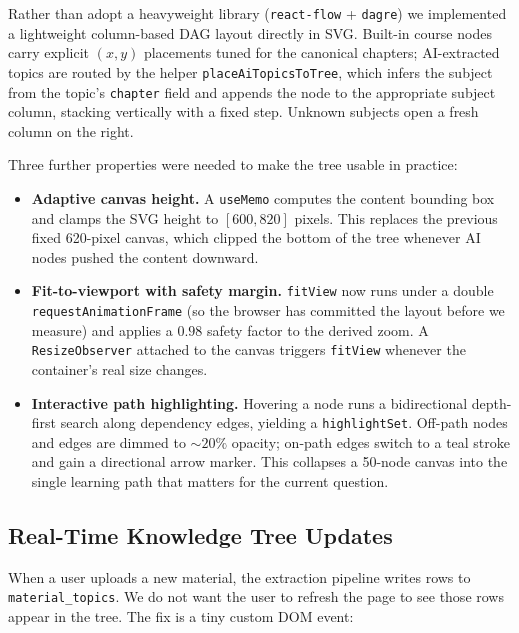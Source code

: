 \documentclass[11pt,a4paper]{article}
\newcommand{\code}[1]{\texttt{\small #1}}
\begin{document}
Rather than adopt a heavyweight library (\code{react-flow} + \code{dagre}) we implemented a lightweight column-based DAG layout directly in SVG. Built-in course nodes carry explicit $(x,y)$ placements tuned for the canonical chapters; AI-extracted topics are routed by the helper \code{placeAiTopicsToTree}, which infers the subject from the topic's \code{chapter} field and appends the node to the appropriate subject column, stacking vertically with a fixed step. Unknown subjects open a fresh column on the right.

Three further properties were needed to make the tree usable in practice:

\begin{itemize}
    \item \textbf{Adaptive canvas height.} A \code{useMemo} computes the content bounding box and clamps the SVG height to $[600, 820]$ pixels. This replaces the previous fixed 620-pixel canvas, which clipped the bottom of the tree whenever AI nodes pushed the content downward.
    \item \textbf{Fit-to-viewport with safety margin.} \code{fitView} now runs under a double \code{requestAnimationFrame} (so the browser has committed the layout before we measure) and applies a $0.98$ safety factor to the derived zoom. A \code{ResizeObserver} attached to the canvas triggers \code{fitView} whenever the container's real size changes.
    \item \textbf{Interactive path highlighting.} Hovering a node runs a bidirectional depth-first search along dependency edges, yielding a \code{highlightSet}. Off-path nodes and edges are dimmed to $\sim\!20\%$ opacity; on-path edges switch to a teal stroke and gain a directional arrow marker. This collapses a 50-node canvas into the single learning path that matters for the current question.
\end{itemize}

\subsection{Real-Time Knowledge Tree Updates}

When a user uploads a new material, the extraction pipeline writes rows to \code{material\_topics}. We do not want the user to refresh the page to see those rows appear in the tree. The fix is a tiny custom DOM event:
\end{document}
